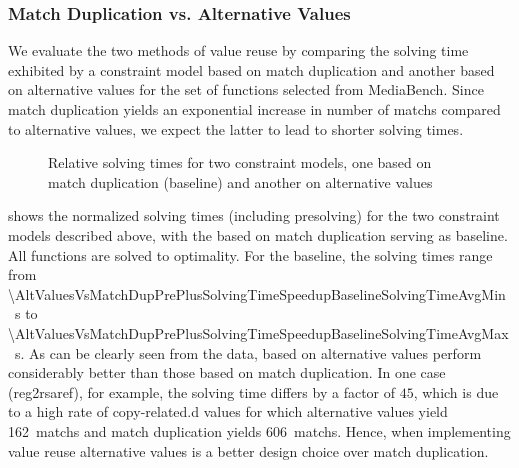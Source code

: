 \subsubsection{Match Duplication vs. Alternative Values}

We evaluate the two methods of \gls{value reuse} by comparing the solving time
exhibited by a \gls{constraint model} based on \gls{match duplication} and
another  based on \glspl{alternative value} for the
set of \glspl{function} selected from \gls{MediaBench}.
%
Since \gls{match duplication} yields an exponential increase in number of
\glspl{match} compared to \glspl{alternative value}, we expect the latter to
lead to shorter solving times.

\begin{figure}
  \centering%
  \maxsizebox{\textwidth}{!}{%
    \trimBarchartPlot{%
    }%
  }

  \caption[%
            Comparing solving times for two constraint models supporting value
            reuse%
          ]%
          {%
            Relative solving times for two constraint models, one based on
            match duplication (baseline) and another on alternative values%
          }
\end{figure}



 shows the normalized
solving times (including presolving) for the two \glspl{constraint model}
described above, with the  based on \gls{match
  duplication} serving as \gls{baseline}.
%
All \glspl{function} are solved to optimality.
%
For the \gls{baseline}, the solving times range from
\SI{\AltValuesVsMatchDupPrePlusSolvingTimeSpeedupBaselineSolvingTimeAvgMin}{\s}
to
\SI{\AltValuesVsMatchDupPrePlusSolvingTimeSpeedupBaselineSolvingTimeAvgMax}{\s}.
%
As can be clearly seen from the data,  based on
\glspl{alternative value} perform considerably better than those based on
\gls{match duplication}.
%
In one case ({\codeFont reg2rsaref}), for example, the solving time differs by a
factor of $45$, which is due to a high rate of \gls{copy-related.d} values for
which \glspl{alternative value} yield \num{162}~\glspl{match} and \gls{match
  duplication} yields \num{606}~\glspl{match}.
%
Hence, when implementing \gls{value reuse} \glspl{alternative value} is a better
design choice over \gls{match duplication}.


